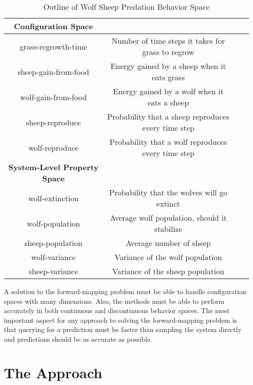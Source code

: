 \begin{table}[ht]
  \caption{Outline of Wolf Sheep Predation Behavior Space}
  \centering
  \begin{tabular}{c c c c}
    \hline \hline
    \textbf{Configuration Space} \\
    \hline
    grass-regrowth-time & Number of time steps it takes for grass to regrow \\
    sheep-gain-from-food & Energy gained by a sheep when it eats grass \\ 
    wolf-gain-from-food & Energy gained by a wolf when it eats a sheep \\
    sheep-reproduce & Probability that a sheep reproduces every time step \\
    wolf-reproduce & Probability that a wolf reproduces every time step\\
    \hline \hline
    \textbf{System-Level Property Space} \\
    \hline
    wolf-extinction & Probability that the wolves will go extinct \\
    wolf-population & Average wolf population, should it stabilize \\
    sheep-population & Average number of sheep \\
    wolf-variance & Variance of the wolf population \\
    sheep-variance & Variance of the sheep population \\
    \hline


  \end{tabular}
  \label{table:ws_parameters}
\end{table}



A solution to the forward-mapping problem must be able to handle configuration spaces with many dimensions.
Also, the methods must be able to perform accurately in both continuous and discontinuous behavior spaces.
The most important aspect for any approach to solving the forward-mapping problem is that querying for a prediction must be faster than sampling the system directly and predictions should be as accurate as possible.

\section{The \fw Approach}

